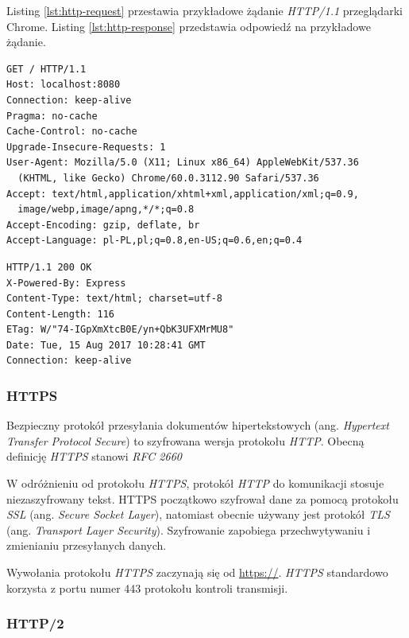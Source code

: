 \documentclass[polish, twoside, 12pt]{mwart}
\begin{document}
Listing \ref{lst:http-request} przestawia przykładowe żądanie \emph{HTTP/1.1} przeglądarki Chrome. Listing \ref{lst:http-response} przedstawia odpowiedź na przykładowe żądanie.

\begin{lstlisting}[caption=Przykładowe żądanie \emph{HTTP/1.1}, label={lst:http-request}]
GET / HTTP/1.1
Host: localhost:8080
Connection: keep-alive
Pragma: no-cache
Cache-Control: no-cache
Upgrade-Insecure-Requests: 1
User-Agent: Mozilla/5.0 (X11; Linux x86_64) AppleWebKit/537.36 
  (KHTML, like Gecko) Chrome/60.0.3112.90 Safari/537.36
Accept: text/html,application/xhtml+xml,application/xml;q=0.9,
  image/webp,image/apng,*/*;q=0.8
Accept-Encoding: gzip, deflate, br
Accept-Language: pl-PL,pl;q=0.8,en-US;q=0.6,en;q=0.4
\end{lstlisting}

\begin{lstlisting}[caption=Przykładowa odpowiedź \emph{HTTP/1.1}, label={lst:http-response}]
HTTP/1.1 200 OK
X-Powered-By: Express
Content-Type: text/html; charset=utf-8
Content-Length: 116
ETag: W/"74-IGpXmXtcB0E/yn+QbK3UFXMrMU8"
Date: Tue, 15 Aug 2017 10:28:41 GMT
Connection: keep-alive
\end{lstlisting}

\subsubsection{HTTPS} \label{https}

Bezpieczny protokół przesyłania dokumentów hipertekstowych (ang. \emph{Hypertext Transfer Protocol Secure}) to szyfrowana wersja protokołu \emph{HTTP}. Obecną definicję \emph{HTTPS} stanowi \emph{RFC 2660} \cite{rfc2660}

W odróżnieniu od protokołu \emph{HTTPS}, protokół \emph{HTTP} do komunikacji stosuje niezaszyfrowany tekst. HTTPS początkowo szyfrował dane za pomocą protokołu \emph{SSL} (ang. \emph{Secure Socket Layer}), natomiast obecnie używany jest protokół \emph{TLS} (ang. \emph{Transport Layer Security}). Szyfrowanie zapobiega przechwytywaniu i zmienianiu przesyłanych danych. 

Wywołania protokołu \emph{HTTPS} zaczynają się od \url{https://}. \emph{HTTPS} standardowo korzysta z portu numer 443 protokołu kontroli transmisji. 

\subsubsection{HTTP/2} \label{http/2}
\end{document}

